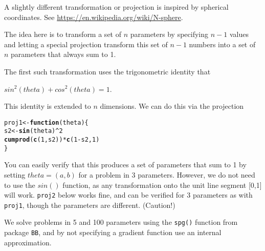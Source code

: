 \documentclass[11pt]{article}\usepackage[]{graphicx}\usepackage[]{color}
\makeatletter
\newcommand{\hlnum}[1]{\textcolor[rgb]{0.686,0.059,0.569}{#1}}%
\newcommand{\hlopt}[1]{\textcolor[rgb]{0,0,0}{#1}}%
\newcommand{\hlstd}[1]{\textcolor[rgb]{0.345,0.345,0.345}{#1}}%
\newcommand{\hlkwa}[1]{\textcolor[rgb]{0.161,0.373,0.58}{\textbf{#1}}}%
\newcommand{\hlkwb}[1]{\textcolor[rgb]{0.69,0.353,0.396}{#1}}%
\newcommand{\hlkwc}[1]{\textcolor[rgb]{0.333,0.667,0.333}{#1}}%
\newcommand{\hlkwd}[1]{\textcolor[rgb]{0.737,0.353,0.396}{\textbf{#1}}}%
\newenvironment{kframe}{%
 \def\at@end@of@kframe{}%
 \ifinner\ifhmode%
  \def\at@end@of@kframe{\end{minipage}}%
  \begin{minipage}{\columnwidth}%
 \fi\fi%
 \def\FrameCommand##1{\hskip\@totalleftmargin \hskip-\fboxsep
 \colorbox{shadecolor}{##1}\hskip-\fboxsep
     \hskip-\linewidth \hskip-\@totalleftmargin \hskip\columnwidth}%
 \MakeFramed {\advance\hsize-\width
   \@totalleftmargin\z@ \linewidth\hsize
   \@setminipage}}%
 {\par\unskip\endMakeFramed%
 \at@end@of@kframe}
\newenvironment{knitrout}{}{} %
\newcommand{\code}[1]{{\tt#1}}
\makeatother
\begin{document}
A slightly different transformation or projection is inspired by spherical coordinates.
See \url{https://en.wikipedia.org/wiki/N-sphere}.

The idea here is to transform a set of $n$ parameters by specifying $n-1$ values and
letting a special projection transform this set of $n-1$ numbers into a set of $n$ parameters
that always sum to 1. 

The first such transformation uses the trigonometric identity that 

$sin^2(theta) + cos^2(theta) =1$.

This identity is extended to $n$ dimensions. We can do this via the projection

\begin{knitrout}\scriptsize
{}\color{fgcolor}\begin{kframe}
\begin{alltt}
\hlstd{proj1} \hlkwb{<-} \hlkwa{function}\hlstd{(}\hlkwc{theta}\hlstd{) \{}
   \hlstd{s2} \hlkwb{<-} \hlkwd{sin}\hlstd{(theta)}\hlopt{^}\hlnum{2}
    \hlkwd{cumprod}\hlstd{(}\hlkwd{c}\hlstd{(}\hlnum{1}\hlstd{, s2))} \hlopt{*} \hlkwd{c}\hlstd{(}\hlnum{1}\hlopt{-}\hlstd{s2,} \hlnum{1}\hlstd{)}
\hlstd{\}}
\end{alltt}
\end{kframe}
\end{knitrout}

You can easily verify that this produces a set of parameters that sum to 1 by setting
$theta = (a,b)$ for a problem in 3 parameters. However, we do not need to use the 
$sin()$ function, as any transformation onto the unit line segment [0,1] will work.
\code{proj2} below works fine, and can be verified for 3 parameters as with \code{proj1},
though the parameters are different. (Caution!)

We solve problems in 5 and 100 parameters using the \code{spg()} function from package
\code{BB}, and by not specifying a gradient function use an internal approximation.
\end{document}
